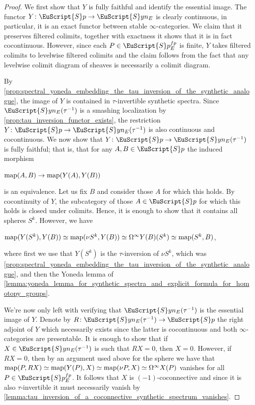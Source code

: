 \documentclass[oneside,a4paper]{amsart}
\newcommand{\euscr}[1]{\EuScript{#1}} %
\newcommand{\map}{\textnormal{map}} %
\newcommand{\spectra}{\euscr{S}p} %
\newcommand{\synspectra}{\euscr{S}yn} %
\newcommand{\spectrafp}{\spectra_{E}^{fp}} %
\theoremstyle{plain}
\theoremstyle{definition}
\theoremstyle{remark}
\begin{document}
\begin{proof}
We first show that $Y$ is fully faithful and identify the essential image. The functor $Y \colon \spectra \rightarrow \synspectra_{E}$ is clearly continuous, in particular, it is an exact functor between stable $\infty$-categories. We claim that it preserves filtered colimits, together with exactness it shows that it is in fact cocontinuous. However, since each $P \in \spectra_{E}^{fp}$ is finite, $Y$ takes filtered colimits to levelwise filtered colimits and the claim follows from the fact that any levelwise colimit diagram of sheaves is necessarily a colimit diagram. 

By \cref{prop:spectral_yoneda_embedding_the_tau_inversion_of_the_synthetic_analogue}, the image of $Y$ is contained in $\tau$-invertible synthetic spectra. Since $\synspectra_{E}(\tau^{-1})$ is a smashing localization by \cref{prop:tau_inversion_functor_exists}, the restriction $Y \colon \spectra \rightarrow \synspectra_{E}(\tau^{-1})$ is also continuous and cocontinuous. We now show that $Y \colon \spectra \rightarrow \synspectra_{E}(\tau^{-1})$ is fully faithful; that is, that for any $A, B \in \spectra$ the induced morphism

\begin{center}
$\map(A, B) \rightarrow \map(Y(A), Y(B))$
\end{center}
is an equivalence. Let us fix $B$ and consider those $A$ for which this holds. By cocontinuity of $Y$, the subcategory of those $A \in \spectra$ for which this holds is closed under colimits. Hence, it is enough to show that it contains all spheres $S^{k}$. However, we have 

\begin{center}
$\map(Y(S^{k}), Y(B)) \simeq \map(\nu S^{k}, Y(B)) \simeq \Omega^{\infty} Y(B) (S^{k}) \simeq \map(S^{k}, B)$,
\end{center}
where first we use that $Y(S^{k})$ is the $\tau$-inversion of $\nu S^{k}$, which was \cref{prop:spectral_yoneda_embedding_the_tau_inversion_of_the_synthetic_analogue}, and then the Yoneda lemma of \cref{lemma:yoneda_lemma_for_synthetic_spectra_and_explicit_formula_for_homotopy_groups}.

We're now only left with verifying that $\synspectra_{E}(\tau^{-1})$ is the essential image of $Y$. Denote by $R \colon \synspectra_{E}(\tau^{-1}) \rightarrow \spectra$ the right adjoint of $Y$ which necessarily exists since the latter is cocontinuous and both $\infty$-categories are presentable. It is enough to show that if $X \in \synspectra_{E} (\tau^{-1})$ is such that $RX = 0$, then $X = 0$. However, if $RX = 0$, then by an argument used above for the sphere we have that $\map(P, RX) \simeq \map(Y(P), X) \simeq \map(\nu P, X) \simeq \Omega^{\infty} X(P)$ vanishes for all $P \in \spectrafp$. It follows that $X$ is $(-1)$-coconnective and since it is also $\tau$-invertible it must necessarily vanish by \cref{lemma:tau_inversion_of_a_coconnective_synthetic_spectrum_vanishes}.


\end{proof}
\end{document}
